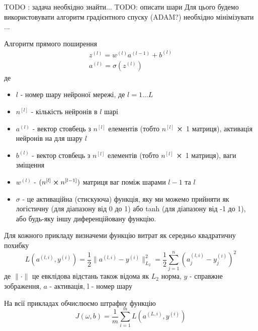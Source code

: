 \documentclass[14pt,a4paper]{extarticle}
\newcounter{e}
\numberwithin{equation}{section}
\numberwithin{figure}{section}
\newcommand{\ith}{^{(i)}}
\newcommand{\lth}{^{(l)}}
\begin{document}
	TODO : задача необхідно знайти...
	TODO: описати шари
	Для цього будемо використовувати алгоритм градієнтного спуску (ADAM?)
	необхідно мінімізувати ...

	\begin{comment}
	Активації ( a
	) – значення, що
	передаються від одного шару до іншого.
	На першому кроці це вхідні дані, на
	останньому – результат.
	\end{comment}
	
	Алгоритм прямого поширення
	\begin{equation}
		\label{dnn-forward-propagation}
		\begin{array}{l}
			\displaystyle
			z\lth=w^{(l)} a^{(l-1)}+b\lth
			\\[0.7cm]
			
			\displaystyle
			a\lth=\sigma (z\lth)
		\end{array}
	\end{equation}
	де
	\begin{itemize}
		\item $l$ - номер шару нейроної мережі, де $l = 1 \dotsc L$
		\item $n^{[l]}$ - кількість нейронів в $l$ шарі
		\item $a\lth$ - вектор стовбець з $n^{[l]}$ елементів (тобто $n^{[l]}$ $\cross$ 1 матриця), активація нейронів на для шару $l$
		\item $b\lth$ - вектор стовбець з $n^{[l]}$ елементів (тобто $n^{[l]}$ $\cross$ 1 матриця),  ваги зміщення
		\item $w\lth$ - $(n^{[l]} \cross n^{[l - 1]})$ матриця ваг поміж шарами $l-1$ та $l$
		\item $\sigma$ - це активаційна (стискуюча) функція, яку ми можемо прийняти як логістичну (для діапазону від 0 до 1) або tanh (для діапазону від -1 до 1), або будь-яку іншу диференційовану функцію.

	\end{itemize}
	
	Для кожного прикладу визначеми функцію витрат як середньо квадратичну похибку
	\begin{equation}
		\label{loss-function-mse}
		L(a^{(l, i)}, y\ith)  =  \frac{1}{2}  \| a^{(l, i)}  - y\ith \|_{L_2}^{2} = \frac{1}{2} \sum_{j=1}^{n}  (a^{(l, i)}_j -  y\ith_j)^2
	\end{equation}
	де $\| \cdot \|$ це евклідова відстань також відома як $L_2$ норма, $y$ - справжне зображення, $a$ - активація, l - номер шару
	
	На всії прикладах обчислюємо штрафну функцію
	\begin{equation}
		\label{cost-function}
		J(\omega, b) =  \frac{1}{m}  \sum_{i=1}^{m} L(a^{(L, i)}, y\ith)
	\end{equation}
	
\end{document}
